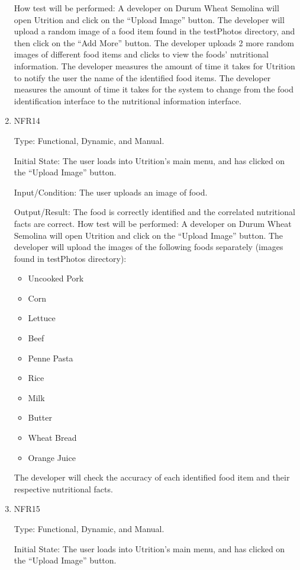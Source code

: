 \documentclass[12pt, titlepage]{article}
\begin{document}
\begin{enumerate}
How test will be performed: A developer on Durum Wheat Semolina will open Utrition and click on the “Upload Image” button. The developer will upload a random image of a food item found in the testPhotos directory, and then click on the “Add More” button. The developer uploads 2 more random images of different food items and clicks to view the foods’ nutritional information. The developer measures the amount of time it takes for Utrition to notify the user the name of the identified food items. The developer measures the amount of time it takes for the system to change from the food identification interface to the nutritional information interface.

\item{NFR14\\} 

Type: Functional, Dynamic, and Manual.

Initial State: The user loads into Utrition’s main menu, and has clicked on the “Upload Image” 
button.

Input/Condition: The user uploads an image of food.

Output/Result: The food is correctly identified and the correlated nutritional facts are correct.
How test will be performed: A developer on Durum Wheat Semolina will open Utrition and click on the “Upload Image” button. The developer will upload the images of the following foods separately (images found in testPhotos directory):
\begin{itemize}
	\item Uncooked Pork
	\item Corn
	\item Lettuce
	\item Beef
	\item Penne Pasta
	\item Rice
	\item Milk
	\item Butter
	\item Wheat Bread
	\item Orange Juice
\end{itemize} 

The developer will check the accuracy of each identified food item and their respective nutritional facts.

\item{NFR15\\} 

Type: Functional, Dynamic, and Manual.

Initial State: The user loads into Utrition’s main menu, and has clicked on the “Upload Image” button.


\end{enumerate}
\end{document}
